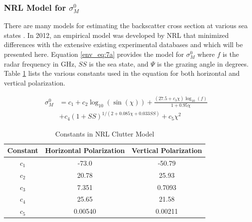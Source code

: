 \subsubsection{NRL Model for $\sigma_M^0$}
There are many models for estimating the backscatter cross section at various sea states \cite{blake_radar} \cite{richards_radar} \cite{nathanson_radar}. In 2012, an empirical model was developed by NRL that minimized differences with the extensive existing experimental databases \cite{gregers-hansen_clutter} and which will be presented here. Equation \ref{env_eq:7a} provides the model for $\sigma_M^0$ where $f$ is the radar frequency in GHz, $SS$ is the sea state, and $\Psi$ is the grazing angle in degrees. Table \ref{env_tab:0} lists the various constants used in the equation for both horizontal and vertical polarization.

\begin{equation}
\begin{aligned}
  \sigma_M^0 &= c_1 + c_2 \log_{10}(\sin(\chi))+\frac{\left(27.5 + c_3\chi\right)\log_{10}(f)}{1+0.95\chi}\\
  &+c_4\left(1 + SS \right)^{1/\left(2+0.085\chi + 0.033SS\right)}
 + c_5\chi^2 
 \end{aligned}
 \label{env_eq:7a}
  \end{equation}
  \renewcommand{\baselinestretch}{2} \small\normalsize
  
  \begin{table}[H]
  \begin{center}
      \renewcommand{\baselinestretch}{1} \small\normalsize
  \begin{quote}
    \caption[Constants in NRL Clutter Model]{Constants in NRL Clutter Model\label{env_tab:0}}
  \end{quote}
  \begin{tabular} {|c | c | c|}
    \hline
  \bf{Constant} & \bf{Horizontal Polarization} & \bf{Vertical Polarization} \\ \hline
  $c_1$ & -73.0 & -50.79  \\ \hline
  $c_2$ & 20.78 & 25.93  \\ \hline
  $c_3$ & 7.351 & 0.7093 \\ \hline
  $c_4$ & 25.65 & 21.58  \\ \hline
  $c_5$ & 0.00540 & 0.00211 \\ \hline
\end{tabular}
\end{center}
\end{table}
\renewcommand{\baselinestretch}{2} \small\normalsize
  
